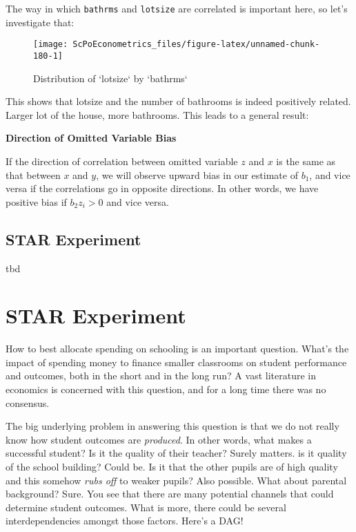 \documentclass[]{book}
\newenvironment{note}{\begin{tcolorbox}[colback=blue!5!white,colframe=blue!75!black]}{\end{tcolorbox}}
\begin{document}
The way in which \texttt{bathrms} and \texttt{lotsize} are correlated is important here, so let's investigate that:

\begin{figure}

{\centering \texttt{[image: ScPoEconometrics\_files/figure-latex/unnamed-chunk-180-1]} 

}

\caption{Distribution of `lotsize` by `bathrms`}\label{fig:unnamed-chunk-180}
\end{figure}

This shows that lotsize and the number of bathrooms is indeed positively related. Larger lot of the house, more bathrooms. This leads to a general result:

\begin{note}
\textbf{Direction of Omitted Variable Bias}

If the direction of correlation between omitted variable \(z\) and \(x\)
is the same as that between \(x\) and \(y\), we will observe upward bias
in our estimate of \(b_1\), and vice versa if the correlations go in
opposite directions. In other words, we have positive bias if
\(b_2 z_i > 0\) and vice versa.
\end{note}

\hypertarget{star-experiment}{%
\section{STAR Experiment}\label{star-experiment}}

tbd

\hypertarget{STAR}{%
\chapter{STAR Experiment}\label{STAR}}

How to best allocate spending on schooling is an important question. What's the impact of spending money to finance smaller classrooms on student performance and outcomes, both in the short and in the long run? A vast literature in economics is concerned with this question, and for a long time there was no consensus.

The big underlying problem in answering this question is that we do not really know how student outcomes are \emph{produced}. In other words, what makes a successful student? Is it the quality of their teacher? Surely matters. is it quality of the school building? Could be. Is it that the other pupils are of high quality and this somehow \emph{rubs off} to weaker pupils? Also possible. What about parental background? Sure. You see that there are many potential channels that could determine student outcomes. What is more, there could be several interdependencies amongst those factors. Here's a DAG!
\end{document}

